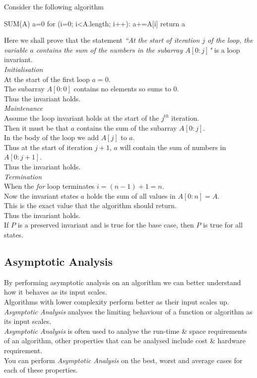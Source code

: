 \documentclass[11pt,a4paper]{article}
\begin{document}
Consider the following algorithm
\begin{code}
SUM(A)
a=0
for (i=0; i<A.length; i++):
  a+=A[i]
return a
\end{code}
Here we shall prove that the statement \textit{``At the start of iteration $j$ of the loop, the variable $a$ contains the sum of the numbers in the subarray $A[0:j]$"} is a loop invariant.\\
\textit{Initialisation}\\
At the start of the first loop $a=0$.\\
The subarray $A[0:0]$ contains no elements so sums to 0.\\
Thus the invariant holds.\\
\textit{Maintenance}\\
Assume the loop invariant holds at the start of the $j^{th}$ iteration.\\
Then it must be that $a$ contains the sum of the subarray $A[0:j]$.\\
In the body of the loop we add $A[j]$ to $a$.\\
Thus at the start of iteration $j+1$, $a$ will contain the sum of numbers in $A[0:j+1]$.\\
Thus the invariant holds.\\
\textit{Termination}\\
When the \textit{for} loop terminates $i=(n-1)+1=n$.\\
Now the invariant states $a$ holds the sum of all values in $A[0:n]=A$.\\
This is the exact value that the algorithm should return.\\
Thus the invariant holds.\\

If $P$ is a preserved invariant and is true for the base case, then $P$ is true for all states.

\subsection{Asymptotic Analysis}

By performing asymptotic analysis on an algorithm we can better understand how it behaves as its input scales.\\
Algorithms with lower complexity perform better as their input scales up.\\

\newpage
{}
\textit{Asymptotic Analysis} analyses the limiting behaviour of a function or algorithm as its input scales.\\
\textit{Asymptotic Analysis} is often used to analyse the run-time \& space requirements of an algorithm, other properties that can be analysed include cost \& hardware requirement.\\
You can perform \textit{Asymptotic Analysis} on the best, worst and average cases for each of these properties.\\
\end{document}
